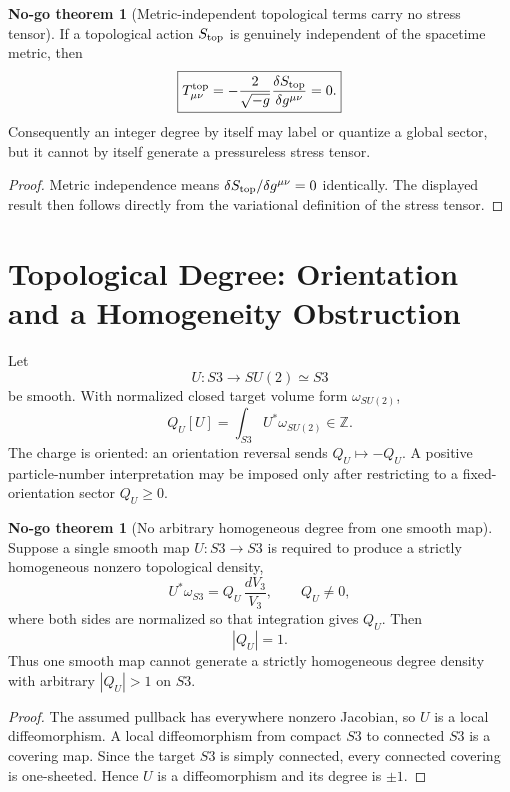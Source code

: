 \documentclass[11pt,a4paper]{article}
\def\Sthree{S3}%
\def\dd{d}%
\def\QU{Q_U}%
\numberwithin{equation}{section}
\theoremstyle{definition}
\newtheorem{nogotheorem}[criterion]{No-go theorem}
\theoremstyle{plain}
\theoremstyle{remark}
\newcommand{\Sthree}{S^3}
\newcommand{\dd}{\mathrm{d}}
\newcommand{\QU}{Q_U}
\begin{document}
\begin{nogotheorem}[Metric-independent topological terms carry no stress tensor]
If a topological action \(S_{\rm top}\) is genuinely independent of the spacetime metric, then
\begin{equation}
\boxed{
T^{\rm top}_{\mu\nu}
=-\frac2{\sqrt{-g}}\frac{\delta S_{\rm top}}{\delta g^{\mu\nu}}
=0.
}
\end{equation}
Consequently an integer degree by itself may label or quantize a global sector, but it cannot by itself generate a pressureless stress tensor.
\end{nogotheorem}
\begin{proof}
Metric independence means \(\delta S_{\rm top}/\delta g^{\mu\nu}=0\) identically. The displayed result then follows directly from the variational definition of the stress tensor.
\end{proof}

\section{Topological Degree: Orientation and a Homogeneity Obstruction}
Let
\begin{equation}
U:\Sthree\longrightarrow SU(2)\simeq\Sthree
\end{equation}
be smooth. With normalized closed target volume form \(\omega_{SU(2)}\),
\begin{equation}
\QU[U]=\int_{\Sthree}U^*\omega_{SU(2)}\in\mathbb Z.
\end{equation}
The charge is oriented: an orientation reversal sends \(\QU\mapsto-\QU\). A positive particle-number interpretation may be imposed only after restricting to a fixed-orientation sector \(\QU\ge0\).

\begin{nogotheorem}[No arbitrary homogeneous degree from one smooth map]
Suppose a single smooth map \(U:\Sthree\to\Sthree\) is required to produce a strictly homogeneous nonzero topological density,
\begin{equation}
U^*\omega_{\Sthree}
=\QU\,\frac{\dd V_3}{V_3},
\qquad
\QU\neq0,
\end{equation}
where both sides are normalized so that integration gives \(\QU\). Then
\begin{equation}
\boxed{|\QU|=1.}
\end{equation}
Thus one smooth map cannot generate a strictly homogeneous degree density with arbitrary \(|\QU|>1\) on \(\Sthree\).
\end{nogotheorem}
\begin{proof}
The assumed pullback has everywhere nonzero Jacobian, so \(U\) is a local diffeomorphism. A local diffeomorphism from compact \(\Sthree\) to connected \(\Sthree\) is a covering map. Since the target \(\Sthree\) is simply connected, every connected covering is one-sheeted. Hence \(U\) is a diffeomorphism and its degree is \(\pm1\).
\end{proof}
\end{document}
